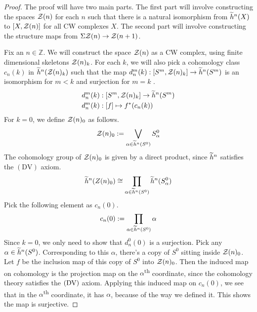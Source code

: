 \begin{proof}
  The proof will have two main parts. The first part will involve constructing the spaces $\mathcal{Z}(n)$
  for each $n$ such that there is a natural isomorphism from $\widetilde{h}^n(X)$ to
  $\left[ X, \mathcal{Z}(n) \right]$ for all CW complexes $X$. The second part will involve constructing
  the structure maps from $\Sigma \mathcal{Z}(n) \to \mathcal{Z}(n+1)$.

  Fix an $n \in \mathbb{Z}$. We will construct the space $\mathcal{Z}(n)$ as a CW complex, using finite
  dimensional skeletons $\mathcal{Z}(n)_k$. For each $k$, we will also pick a cohomology class $c_n(k)$ in
  $\widetilde{h}^n(\mathcal{Z}(n)_k)$ such that the map
  $d_n^{m}(k): \left[S^m, \mathcal{Z}(n)_k \right] \to \widetilde{h}^n(S^m)$ is an isomorphism for $m < k$ and
  surjection for $m=k$ .
  \begin{align*}
    d_n^{m}(k) &: \left[ S^m, \mathcal{Z}(n)_k\right] \to \widetilde{h}^n(S^m) \\
    d_n^{m}(k) &: [f] \mapsto f^{\ast}(c_n(k))
  \end{align*}
  For $k=0$, we define $\mathcal{Z}(n)_0$ as follows.
  \begin{align*}
    \mathcal{Z}(n)_0 := \bigvee_{\alpha \in \widetilde{h}^n(S^0)} S_{\alpha}^0
  \end{align*}
  The cohomology group of $\mathcal{Z}(n)_0$ is given by a direct product, since $\widetilde{h}^n$ satisfies the
  $\mathrm{(DV)}$ axiom.
  \begin{align*}
    \widetilde{h}^n(Z(n)_0) \cong \prod_{\alpha \in \widetilde{h}^n(S^0)} \widetilde{h}^n(S_{\alpha}^0)
  \end{align*}
  Pick the following element as $c_n(0)$.
  \begin{align*}
    c_n(0) := \prod_{\alpha \in \widetilde{h}^n(S^0)} \alpha
  \end{align*}
  Since $k=0$, we only need to show that $d_n^0(0)$ is a surjection. Pick any
  $\alpha \in \widetilde{h}^n(S^0)$.  Corresponding to this $\alpha$, there's a copy of $S^0$ sitting
  inside $\mathcal{Z}(n)_0$. Let $f$ be the inclusion map of this copy of $S^0$ into $\mathcal{Z}(n)_0$. Then
  the induced map on cohomology is the projection map on the $\alpha$\textsuperscript{th}
  coordinate, since the cohomology theory satisfies the $(\mathrm{DV})$ axiom. Applying this induced map on
  $c_n(0)$, we see that in the $\alpha$\textsuperscript{th} coordinate, it has $\alpha$, because of
  the way we defined it.  This shows the map is surjective.


\end{proof}
